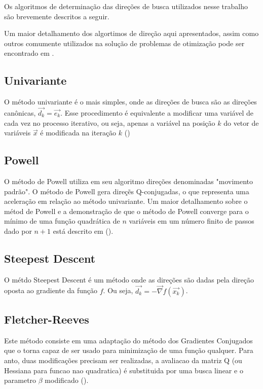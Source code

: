 \documentclass[10pt, a4paper]{article}
\begin{document}
Os algoritmos de determina\c c\~ao das dire\c c\~oes de busca utilizados nesse trabalho s\~ao brevemente descritos a seguir.

Um maior detalhamento dos algortimos de dire\c c\~ao aqui apresentados, assim como outros comumente utilizados na solu\c c\~ao de problemas de otimiza\c c\~ao pode ser encontrado em \cite{apostila}.


\subsection{Univariante}

O m\'etodo univariante \'e o mais simples, onde as dire\c c\~oes de busca s\~ao as dire\c c\~oes can\^onicas, $\vec{d_{k}}=\vec{e_{k}}$. Esse procedimento \'e equivalente a modificar uma vari\'avel de cada vez no processo iterativo, ou seja, apenas a vari\'avel na posi\c c\~ao $k$ do vetor de vari\'aveis $\vec{x}$ \'e modificada na itera\c c\~ao $k$ (\cite{apostila})
\subsection{Powell}

O m\'etodo de Powell utiliza em seu algoritmo dire\c c\~oes denominadas "movimento padr\~ao". O m\'etodo de Powell gera dire\c c\~es Q-conjugadas, o que representa uma acelera\c c\~ao em rela\c c\~ao ao m\'etodo univariante. Um maior detalhamento sobre o m\'etod de Powell e a demonstra\c c\~ao de que o m\'etodo de Powell converge para o m\'inimo de uma fun\c c\~ao quadr\'atica de $n$ vari\'aveis em um n\'umero finito de passos dado por $n+1$ est\'a descrito em (\cite{apostila}).

\subsection{Steepest Descent}

O m\'etdo Steepest Descent \'e um m\'etodo onde as dire\c c\~oes s\~ao dadas pela dire\c c\~ao oposta ao gradiente da fun\c c\~ao $f$. Ou seja, $\vec{d_{k}} = -\vec{\nabla} f(\vec{x_{k}})$.

\subsection{Fletcher-Reeves}

Este m\'etodo consiste em uma adapta\c c\~ao do m\'etodo dos Gradientes Conjugados que o torna capaz de ser usado para minimiza\c c\~ao de uma fun\c c\~ao qualquer. Para anto, duas modifica\c c\~oes precisam ser realizadas, a avaliacao da matriz Q (ou Hessiana para funcao nao quadratica) \'e substituida por uma busca linear e o parametro $\beta$ modificado (\cite{apostila}).
\end{document}
